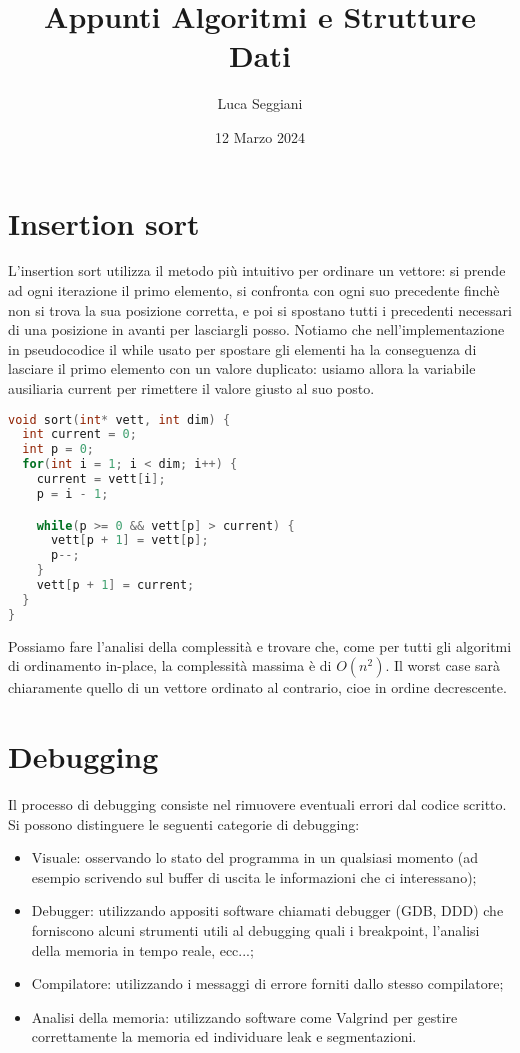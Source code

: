 \documentclass[a4paper,12pt]{article}
\title{Appunti Algoritmi e Strutture Dati}
\author{Luca Seggiani}
\date{12 Marzo 2024}
\begin{document}
\maketitle
\section{Insertion sort}
L'insertion sort utilizza il metodo più intuitivo per ordinare un vettore: si prende ad ogni iterazione 
il primo elemento, si confronta con ogni suo precedente finchè non si trova la sua posizione corretta, e poi
si spostano tutti i precedenti necessari di una posizione in avanti per lasciargli posso. Notiamo che nell'implementazione
in pseudocodice il while usato per spostare gli elementi ha la conseguenza di lasciare il primo elemento con un 
valore duplicato: usiamo allora la variabile ausiliaria current per rimettere il valore giusto al suo posto.

\begin{lstlisting}[language=C++]
void sort(int* vett, int dim) {
  int current = 0;
  int p = 0;
  for(int i = 1; i < dim; i++) {
    current = vett[i];
    p = i - 1;

    while(p >= 0 && vett[p] > current) {
      vett[p + 1] = vett[p];
      p--;
    }
    vett[p + 1] = current;
  }
}
\end{lstlisting}

Possiamo fare l'analisi della complessità e trovare che, come per tutti gli algoritmi di ordinamento in-place, la complessità
massima è di $O(n^2)$. Il worst case sarà chiaramente quello di un vettore ordinato al contrario, cioe in ordine decrescente.

\section{Debugging}
Il processo di debugging consiste nel rimuovere eventuali errori dal codice scritto. Si possono distinguere le seguenti
categorie di debugging:

\begin{itemize}
  \item Visuale: osservando lo stato del programma in un qualsiasi momento (ad esempio scrivendo sul buffer di uscita
    le informazioni che ci interessano);
  \item Debugger: utilizzando appositi software chiamati debugger (GDB, DDD) che forniscono alcuni strumenti utili al debugging
    quali i breakpoint, l'analisi della memoria in tempo reale, ecc...;
  \item Compilatore: utilizzando i messaggi di errore forniti dallo stesso compilatore;
  \item Analisi della memoria: utilizzando software come Valgrind per gestire correttamente la memoria ed individuare
    leak e segmentazioni.
\end{itemize}
\end{document}
